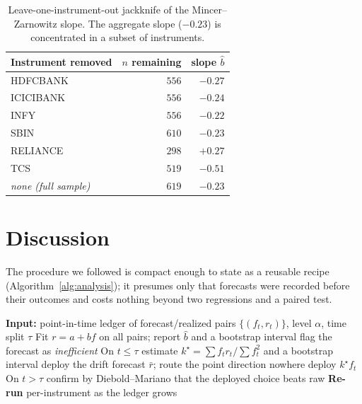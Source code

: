 \documentclass[10pt,twocolumn,twoside]{eec_style}
\begin{document}
\begin{table}[!t]
\footnotesize
\centering
\caption{Leave-one-instrument-out jackknife of the Mincer--Zarnowitz slope. The
aggregate slope ($-0.23$) is concentrated in a subset of instruments.}
\label{tab:jack}
\vspace{2pt}
\begin{tabular}{lrr}
\toprule
Instrument removed & $n$ remaining & slope $\hat b$ \\
\midrule
HDFCBANK  & $556$ & $-0.27$ \\
ICICIBANK & $556$ & $-0.24$ \\
INFY      & $556$ & $-0.22$ \\
SBIN      & $610$ & $-0.23$ \\
RELIANCE  & $298$ & $+0.27$ \\
TCS       & $519$ & $-0.51$ \\
\midrule
\emph{none (full sample)} & $619$ & $-0.23$ \\
\bottomrule
\end{tabular}
\end{table}

\section{Discussion}
\label{sec:discussion}
The procedure we followed is compact enough to state as a reusable recipe
(Algorithm~\ref{alg:analysis}); it presumes only that forecasts were recorded before their
outcomes and costs nothing beyond two regressions and a paired test.

\begin{algorithm}[!t]
\caption{Efficiency analysis and shrinkage correction}
\label{alg:analysis}
\begin{algorithmic}[1]
\STATE \textbf{Input:} point-in-time ledger of forecast/realized pairs $\{(f_t,r_t)\}$,
level $\alpha$, time split $\tau$
\STATE Fit $r=a+bf$ on all pairs; report $\hat b$ and a bootstrap interval
  \STATE flag the forecast as \emph{inefficient}
\ENDIF
\STATE On $t\le\tau$ estimate $k^\star=\sum f_t r_t/\sum f_t^2$ and a bootstrap interval
  \STATE deploy the drift forecast $\bar r$; route the point direction nowhere
\ELSE
  \STATE deploy $k^\star f_t$
\ENDIF
\STATE On $t>\tau$ confirm by Diebold--Mariano that the deployed choice beats raw
\STATE \textbf{Re-run} per-instrument as the ledger grows
\end{algorithmic}
\end{algorithm}
\end{document}
